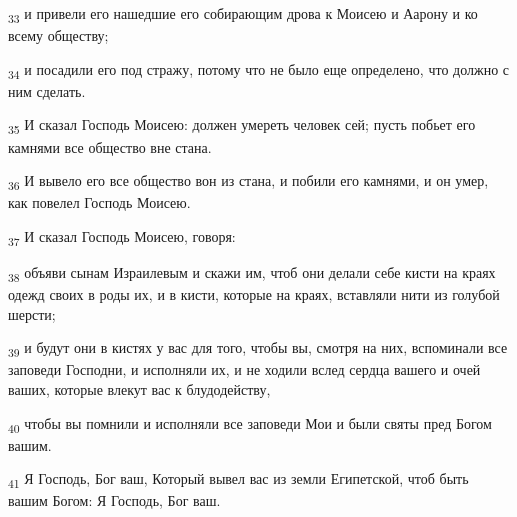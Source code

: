 \begin{tcolorbox}
\textsubscript{33} и привели его нашедшие его собирающим дрова к Моисею и Аарону и ко всему обществу;
\end{tcolorbox}
\begin{tcolorbox}
\textsubscript{34} и посадили его под стражу, потому что не было еще определено, что должно с ним сделать.
\end{tcolorbox}
\begin{tcolorbox}
\textsubscript{35} И сказал Господь Моисею: должен умереть человек сей; пусть побьет его камнями все общество вне стана.
\end{tcolorbox}
\begin{tcolorbox}
\textsubscript{36} И вывело его все общество вон из стана, и побили его камнями, и он умер, как повелел Господь Моисею.
\end{tcolorbox}
\begin{tcolorbox}
\textsubscript{37} И сказал Господь Моисею, говоря:
\end{tcolorbox}
\begin{tcolorbox}
\textsubscript{38} объяви сынам Израилевым и скажи им, чтоб они делали себе кисти на краях одежд своих в роды их, и в кисти, которые на краях, вставляли нити из голубой шерсти;
\end{tcolorbox}
\begin{tcolorbox}
\textsubscript{39} и будут они в кистях у вас для того, чтобы вы, смотря на них, вспоминали все заповеди Господни, и исполняли их, и не ходили вслед сердца вашего и очей ваших, которые влекут вас к блудодейству,
\end{tcolorbox}
\begin{tcolorbox}
\textsubscript{40} чтобы вы помнили и исполняли все заповеди Мои и были святы пред Богом вашим.
\end{tcolorbox}
\begin{tcolorbox}
\textsubscript{41} Я Господь, Бог ваш, Который вывел вас из земли Египетской, чтоб быть вашим Богом: Я Господь, Бог ваш.
\end{tcolorbox}
